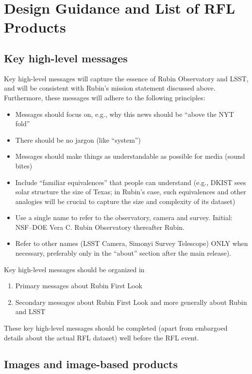 \section{Design Guidance and List of RFL Products \label{RFLproducts}}

\subsection{Key high-level messages \label{khlm}}

Key high-level messages will capture the essence of Rubin Observatory and LSST, and will be
consistent with Rubin's mission statement discussed above. Furthermore, these messages
will adhere to the following principles:
\begin{itemize}
\item Messages should focus on, e.g., why this news should be ``above the NYT fold''
\item There should be no jargon (like ``system'')
\item Messages should make things as understandable as possible for media (sound bites)
\item Include ``familiar equivalences'' that people can understand (e.g., DKIST sees solar structure the size of Texas;
     in Rubin's case, such equivalences and other analogies will be crucial to capture the size and complexity of its dataset) 
\item Use a single name to refer to the observatory, camera and survey. Initial: NSF–DOE Vera C. Rubin Observatory thereafter Rubin. 
\item Refer to other names (LSST Camera, Simonyi Survey Telescope) ONLY when necessary, preferably only in the ``about'' section after the main release).
\end{itemize}

Key high-level messages should be organized in
\begin{enumerate}
\item Primary messages about Rubin First Look
\item Secondary messages about Rubin First Look and more generally about Rubin and LSST
\end{enumerate}

These key high-level messages should be completed (apart from embargoed details about
the actual RFL dataset) well before the RFL event. 
 

\subsection{Images and image-based products}

